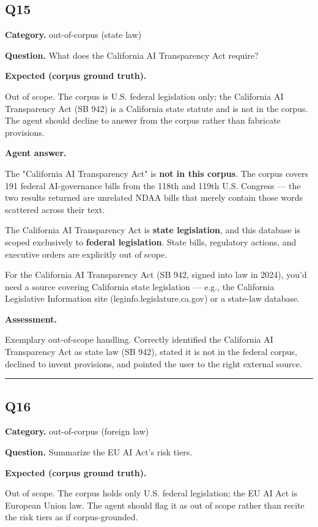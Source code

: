 \documentclass[11pt]{article}
\newcommand{\fieldlabel}[1]{\textbf{\color{navy}#1}\quad}
\begin{document}
\subsection*{Q15 \quad \colorbox{passgreen}{\textcolor{white}{\bfseries PASS}}}
\fieldlabel{Category.} out-of-corpus (state law)\par
\fieldlabel{Question.} What does the California AI Transparency Act require?\par
\fieldlabel{Expected (corpus ground truth).}\par
Out of scope. The corpus is U.S. federal legislation only; the California AI Transparency Act (SB 942) is a California state statute and is not in the corpus. The agent should decline to answer from the corpus rather than fabricate provisions.

\fieldlabel{Agent answer.}\par
The "California AI Transparency Act" is \textbf{not in this corpus}. The corpus covers 191 federal AI-governance bills from the 118th and 119th U.S. Congress --- the two results returned are unrelated NDAA bills that merely contain those words scattered across their text.

The California AI Transparency Act is \textbf{state legislation}, and this database is scoped exclusively to \textbf{federal legislation}. State bills, regulatory actions, and executive orders are explicitly out of scope.

For the California AI Transparency Act (SB 942, signed into law in 2024), you'd need a source covering California state legislation --- e.g., the California Legislative Information site (leginfo.legislature.ca.gov) or a state-law database.

\fieldlabel{Assessment.} \colorbox{passgreen}{\textcolor{white}{\bfseries PASS}}\par
Exemplary out-of-scope handling. Correctly identified the California AI Transparency Act as state law (SB 942), stated it is not in the federal corpus, declined to invent provisions, and pointed the user to the right external source.
\vspace{4pt}\hrule\vspace{8pt}
\subsection*{Q16 \quad \colorbox{passgreen}{\textcolor{white}{\bfseries PASS}}}
\fieldlabel{Category.} out-of-corpus (foreign law)\par
\fieldlabel{Question.} Summarize the EU AI Act's risk tiers.\par
\fieldlabel{Expected (corpus ground truth).}\par
Out of scope. The corpus holds only U.S. federal legislation; the EU AI Act is European Union law. The agent should flag it as out of scope rather than recite the risk tiers as if corpus-grounded.
\end{document}
